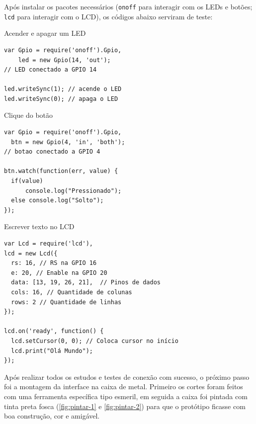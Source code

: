 \documentclass[
		12pt,				%
		openright,			%
		oneside,			%
		a4paper,			%
		chapter=TITLE,		%
		english,			%
		brazil				%
	]{abntex2}
\begin{document}
Após instalar os pacotes necessários (\texttt{onoff} para interagir com os LEDs e botões; \texttt{lcd} para interagir com o LCD), os códigos abaixo serviram de teste:

\begin{center}
	\centering
 	\begin{minipage}{0.45\textwidth}
		Acender e apagar um LED
		\begin{verbatim}
var Gpio = require('onoff').Gpio,
    led = new Gpio(14, 'out'); 
// LED conectado a GPIO 14
    
led.writeSync(1); // acende o LED
led.writeSync(0); // apaga o LED
		\end{verbatim}
	\end{minipage}
	\hfill
	\begin{minipage}{0.5\textwidth}
		Clique do botão
		\begin{verbatim}
var Gpio = require('onoff').Gpio,
  btn = new Gpio(4, 'in', 'both');
// botao conectado a GPIO 4
 
btn.watch(function(err, value) {
  if(value) 
      console.log("Pressionado");
  else console.log("Solto");
});
		\end{verbatim}
	\end{minipage}
\end{center}

\begin{center}
	\centering
	\begin{minipage}{1\textwidth}
		Escrever texto no LCD
		\begin{verbatim}
var Lcd = require('lcd'),
lcd = new Lcd({
  rs: 16, // RS na GPIO 16
  e: 20, // Enable na GPIO 20
  data: [13, 19, 26, 21],  // Pinos de dados
  cols: 16, // Quantidade de colunas
  rows: 2 // Quantidade de linhas
});

lcd.on('ready', function() {
  lcd.setCursor(0, 0); // Coloca cursor no início
  lcd.print("Olá Mundo");
});

		\end{verbatim}
	\end{minipage}
\end{center}

Após realizar todos os estudos e testes de conexão com sucesso, o próximo passo foi a montagem da interface na caixa de metal. Primeiro os cortes foram feitos com uma ferramenta específica tipo esmeril, em seguida a caixa foi pintada com tinta preta fosca (\autoref{fig:pintar-1} e \autoref{fig:pintar-2}) para que o protótipo ficasse com boa construção, cor e amigável.
\end{document}
